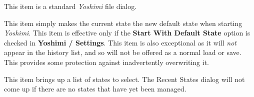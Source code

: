    This item is a standard \textsl{Yoshimi} file dialog.

   This item simply makes the current state the new default state when starting
   \textsl{Yoshimi}.
   This item is effective only if the \textbf{Start With Default State}
   option is checked in \textbf{Yoshimi / Settings}. This item is also
   exceptional as it will \textsl{not} appear in the history list, and so
   will not be offered as a normal load or save. This provides some protection
   against inadvertently overwriting it.

   This item brings up a list of states to select.
   The Recent States dialog will not come up if there are no states that have
   yet been managed.

